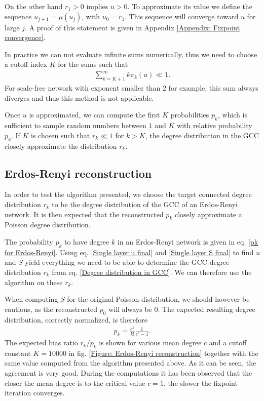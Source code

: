 \documentclass[
11pt, %
american, %
singlespacing, %
final, %
nolistspacing, %
liststotoc, %
headsepline, %
]{MastersDoctoralThesis} %
\begin{document}
On the other hand $r_1 > 0$ implies $u > 0$. To approximate its value we define the sequence $u_{j+1} = \mu(u_j)$, with $u_0 = r_1$. This sequence will converge toward $u$ for large $j$. A proof of this statement is given in Appendix \ref{Appendix: Fixpoint convergence}.

In practice we can not evaluate infinite sums numerically, thus we need to choose a cutoff index $K$ for the sums such that
\begin{align}
	\sum_{k=K+1}^\infty k \pi_k(u) \ll 1.
\end{align}
For scale-free network with exponent smaller than 2 for example, this sum always diverges and thus this method is not applicable.

Once $u$ is approximated, we can compute the first $K$ probabilities $p_k$, which is sufficient to sample random numbers between $1$ and $K$ with relative probability $p_k$. If $K$ is chosen such that $r_k \ll 1$ for $k > K$, the degree distribution in the GCC closely approximate the distribution $r_k$.

\subsection{Erdos-Renyi reconstruction}

In order to test the algorithm presented, we choose the target connected degree distribution $r_k$ to be the degree distribution of the GCC of an Erdos-Renyi network. It is then expected that the reconstructed $p_k$ closely approximate a Poisson degree distribution.

The probability $p_k$ to have degree $k$ in an Erdos-Renyi network is given in eq. \eqref{pk for Erdos-Renyi}. Using eq. \eqref{Single layer u final} and \eqref{Single layer S final} to find $u$ and $S$ yield everything we need to be able to determine the GCC degree distribution $r_k$ from eq. \eqref{Degree distribution in GCC}. We can therefore use the algorithm on these $r_k$.

When computing $S$ for the original Poisson distribution, we should however be cautious, as the reconstructed $p_0$ will always be $0$. The expected resulting degree distribution, correctly normalized, is therefore
\begin{align}
	p_k = \frac{c^k}{k!} \frac{1}{e^{c} - 1}.
\end{align}
The expected bias ratio $r_k/p_k$ is shown for various mean degree $c$ and a cutoff constant $K = 10000$ in fig. \ref{Figure: Erdos-Renyi reconstruction} together with the same value computed from the algorithm presented above. As it can be seen, the agreement is very good. During the computations it has been observed that the closer the mean degree is to the critical value $c = 1$, the slower the fixpoint iteration converges.
\end{document}
